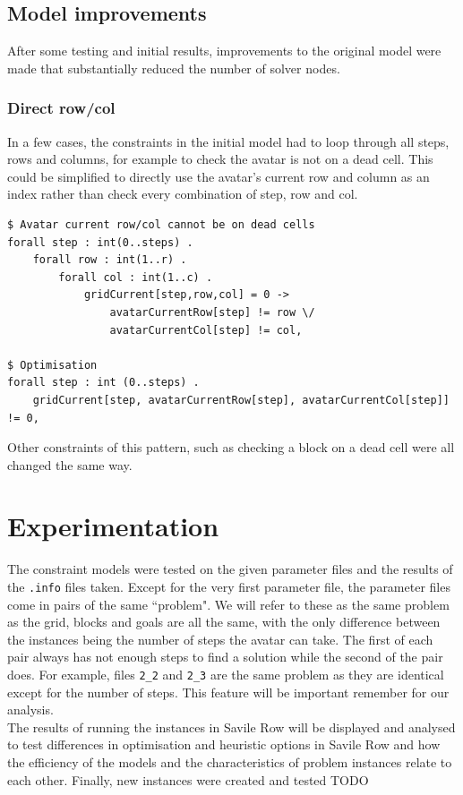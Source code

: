 \documentclass{article}
\newcommand{\n}[0]{\\[\baselineskip]}
\begin{document}
\subsection{Model improvements}
After some testing and initial results, improvements to the original model were made that substantially reduced the number of solver nodes. 
\subsubsection{Direct row/col}
In a few cases, the constraints in the initial model had to loop through all steps, rows and columns, for example to check the avatar is not on a dead cell. This could be simplified to directly use the avatar's current row and column as an index rather than check every combination of step, row and col.
\begin{lstlisting}[caption={Example of optimising number of constraints by directly indexing with \texttt{avatarCurrentRow} and \texttt{avatarCurrentCol}.}, captionpos=b]
$ Avatar current row/col cannot be on dead cells
forall step : int(0..steps) .
    forall row : int(1..r) .
        forall col : int(1..c) .
	    	gridCurrent[step,row,col] = 0 -> 
	    		avatarCurrentRow[step] != row \/ 
	    		avatarCurrentCol[step] != col,

$ Optimisation
forall step : int (0..steps) .
    gridCurrent[step, avatarCurrentRow[step], avatarCurrentCol[step]] != 0,
\end{lstlisting}
Other constraints of this pattern, such as checking a block on a dead cell were all changed the same way.

\section{Experimentation}
The constraint models were tested on the given parameter files and the results of the \texttt{.info} files taken. Except for the very first parameter file, the parameter files come in pairs of the same ``problem". We will refer to these as the same problem as the grid, blocks and goals are all the same, with the only difference between the instances being the number of steps the avatar can take. The first of each pair always has not enough steps to find a solution while the second of the pair does. For example, files \texttt{2\_2} and \texttt{2\_3} are the same problem as they are identical except for the number of steps. This feature will be important remember for our analysis. 
\n
The results of running the instances in Savile Row will be displayed and analysed to test differences in optimisation and heuristic options in Savile Row and how the efficiency of the models and the characteristics of problem instances relate to each other. Finally, new instances were created and tested TODO
\end{document}
